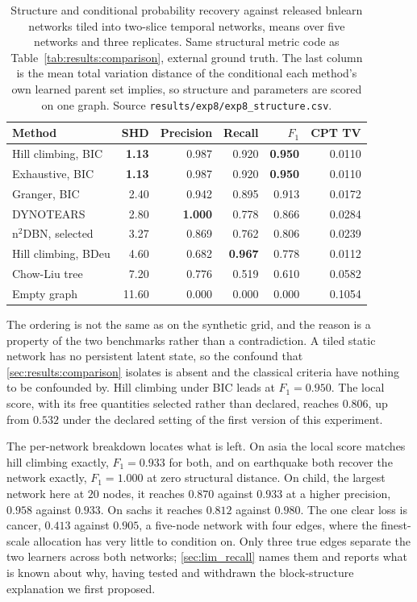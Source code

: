\begin{table}[t]
\centering
\caption{Structure and conditional probability recovery against released
bnlearn networks tiled into two-slice temporal networks, means over five
networks and three replicates. Same structural metric code as
Table~\ref{tab:results:comparison}, external ground truth. The last column is
the mean total variation distance of the conditional each method's own learned
parent set implies, so structure and parameters are scored on one graph.
Source \texttt{results/exp8/exp8\_structure.csv}.}
\label{tab:results:external}
\begin{tabular}{lrrrrr}
\toprule
Method & SHD & Precision & Recall & $F_1$ & CPT TV \\
\midrule
Hill climbing, BIC     & \textbf{1.13} & 0.987 & 0.920 & \textbf{0.950} & 0.0110 \\
Exhaustive, BIC        & \textbf{1.13} & 0.987 & 0.920 & \textbf{0.950} & 0.0110 \\
Granger, BIC           & 2.40 & 0.942 & 0.895 & 0.913 & 0.0172 \\
DYNOTEARS              & 2.80 & \textbf{1.000} & 0.778 & 0.866 & 0.0284 \\
n$^2$DBN, selected     & 3.27 & 0.869 & 0.762 & 0.806 & 0.0239 \\
Hill climbing, BDeu    & 4.60 & 0.682 & \textbf{0.967} & 0.778 & 0.0112 \\
Chow-Liu tree          & 7.20 & 0.776 & 0.519 & 0.610 & 0.0582 \\
Empty graph            & 11.60 & 0.000 & 0.000 & 0.000 & 0.1054 \\
\bottomrule
\end{tabular}
\end{table}

The ordering is not the same as on the synthetic grid, and the reason is a
property of the two benchmarks rather than a contradiction. A tiled static
network has no persistent latent state, so the confound that
\cref{sec:results:comparison} isolates is absent and the classical criteria
have nothing to be confounded by. Hill climbing under BIC leads at $F_1 =
0.950$. The local score, with its free quantities selected rather than
declared, reaches $0.806$, up from $0.532$ under the declared setting of the
first version of this experiment.

The per-network breakdown locates what is left. On asia the local score matches
hill climbing exactly, $F_1 = 0.933$ for both, and on earthquake both recover
the network exactly, $F_1 = 1.000$ at zero structural distance. On child, the
largest network here at $20$ nodes, it reaches $0.870$ against $0.933$ at a
higher precision, $0.958$ against $0.933$. On sachs it reaches $0.812$ against
$0.980$. The one clear loss is cancer, $0.413$ against $0.905$, a five-node
network with four edges, where the finest-scale allocation has very little to
condition on. Only three true edges separate the two learners across both
networks; \cref{sec:lim_recall} names them and reports what is known about why,
having tested and withdrawn the block-structure explanation we first proposed.

